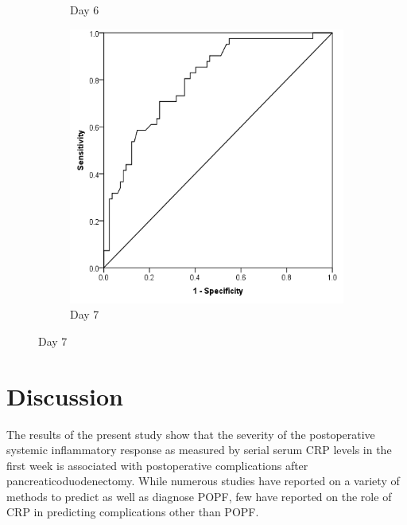\begin{figure}[t]
\begin{subfigure}{0.3\textwidth}
		\caption{Day 6}		
		\label{fig:crp_comp_ROC_infection_D6}
	\end{subfigure}
	\begin{subfigure}{0.3\textwidth}
		\centering
		\includegraphics[width=\textwidth]{Figures/crp_comp_ROC_infection_D7}
		\caption{Day 7}
		\label{fig:crp_comp_ROC_infection_D7}
	\end{subfigure}
\end{figure}
\vfill





\clearpage
\section{Discussion}

The results of the present study show that the severity of the postoperative systemic inflammatory response as measured by serial serum CRP levels in the first week is associated with postoperative complications after pancreaticoduodenectomy. While numerous studies have reported on a variety of methods to predict as well as diagnose POPF, few have reported on the role of CRP in predicting complications other than POPF.

